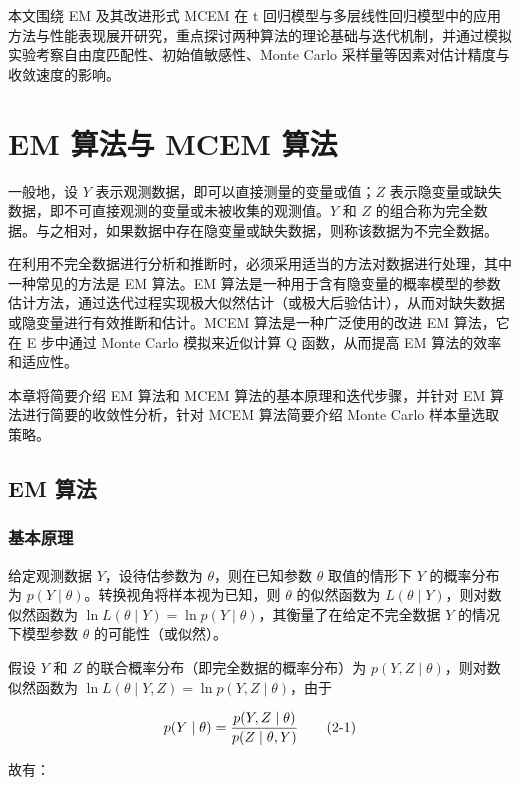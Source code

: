 \documentclass[12pt,a4paper]{ctexart}
\makeatletter
\numberwithin{figure}{section}
\numberwithin{table}{section}
\let\ltx@orig@tag\tag
\renewcommand{\tag}[1]{\refstepcounter{equation}\ltx@orig@tag{#1}}%
\makeatother
\begin{document}
本文围绕 EM 及其改进形式 MCEM 在 t 回归模型与多层线性回归模型中的应用方法与性能表现展开研究，重点探讨两种算法的理论基础与迭代机制，并通过模拟实验考察自由度匹配性、初始值敏感性、Monte Carlo 采样量等因素对估计精度与收敛速度的影响。

\section{EM 算法与 MCEM 算法}

一般地，设 $Y$ 表示观测数据，即可以直接测量的变量或值；$Z$ 表示隐变量或缺失数据，即不可直接观测的变量或未被收集的观测值。$Y$ 和 $Z$ 的组合称为完全数据。与之相对，如果数据中存在隐变量或缺失数据，则称该数据为不完全数据。

在利用不完全数据进行分析和推断时，必须采用适当的方法对数据进行处理，其中一种常见的方法是 EM 算法。EM 算法是一种用于含有隐变量的概率模型的参数估计方法，通过迭代过程实现极大似然估计（或极大后验估计），从而对缺失数据或隐变量进行有效推断和估计。MCEM 算法是一种广泛使用的改进 EM 算法，它在 E 步中通过 Monte Carlo 模拟来近似计算 Q 函数，从而提高 EM 算法的效率和适应性。

本章将简要介绍 EM 算法和 MCEM 算法的基本原理和迭代步骤，并针对 EM 算法进行简要的收敛性分析，针对 MCEM 算法简要介绍 Monte Carlo 样本量选取策略。

\subsection{EM 算法}

\subsubsection{基本原理}

给定观测数据 $Y$，设待估参数为 $\theta$，则在已知参数 $\theta$ 取值的情形下 $Y$ 的概率分布为 $p(Y\mid\theta)$。转换视角将样本视为已知，则 $\theta$ 的似然函数为 $L(\theta\mid Y)$，则对数似然函数为 $\ln L(\theta\mid Y) = \ln p(Y\mid\theta)$，其衡量了在给定不完全数据 $Y$ 的情况下模型参数 $\theta$ 的可能性（或似然）。

假设 $Y$ 和 $Z$ 的联合概率分布（即完全数据的概率分布）为 $p(Y,Z\mid\theta)$，则对数似然函数为 $\ln L(\theta\mid Y,Z) = \ln p(Y,Z\mid\theta)$，由于

\begin{equation}
p(Y\mid\theta) = \frac{p(Y,Z\mid\theta)}{p(Z\mid\theta,Y)} \tag{2-1}
\end{equation}

故有：
\end{document}
